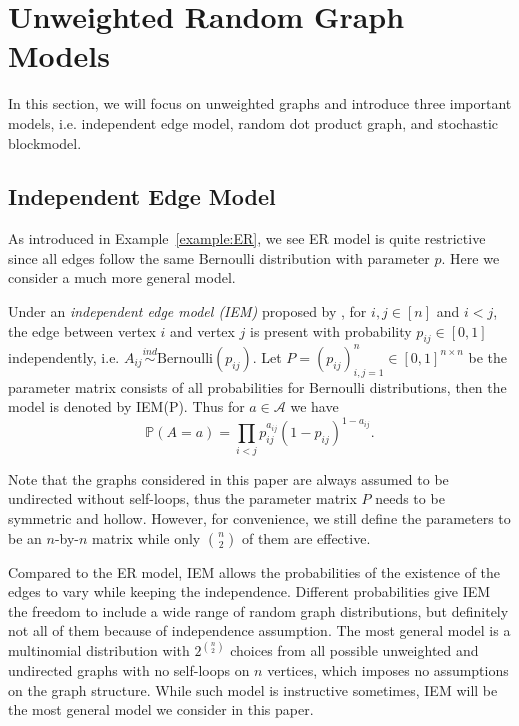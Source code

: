 \section{Unweighted Random Graph Models}
\label{sec:unweighted_graphs}

In this section, we will focus on unweighted graphs and introduce three important models, i.e. independent edge model, random dot product graph, and stochastic blockmodel. 



\subsection{Independent Edge Model}
\label{sec:IEM}

As introduced in Example~\ref{example:ER}, we see ER model is quite restrictive since all edges follow the same Bernoulli distribution with parameter $p$. Here we consider a much more general model.

\begin{definition}
\label{def:IEM}
Under an {\em{independent edge model} (IEM)} proposed by \citet{bollobas2007phase}, for $i, j \in [n]$ and $i < j$, the edge between vertex $i$ and vertex $j$ is present with probability $p_{ij} \in [0, 1]$ independently, i.e. $A_{ij} \stackrel{ind}{\sim} \mathrm{Bernoulli}(p_{ij})$. Let $P = (p_{ij})_{i,j = 1}^n \in [0, 1]^{n \times n}$ be the parameter matrix consists of all probabilities for Bernoulli distributions, then the model is denoted by IEM(P).
Thus for $a \in \mathcal{A}$ we have
\[
	\mathbb{P}(A = a) = \prod_{i < j} p_{ij}^{a_{ij}} (1 - p_{ij})^{1 - a_{ij}}.
\]
\end{definition}

Note that the graphs considered in this paper are always assumed to be undirected without self-loops, thus the parameter matrix $P$ needs to be symmetric and hollow. However, for convenience, we still define the parameters to be an $n$-by-$n$ matrix while only $n \choose 2$ of them are effective.

Compared to the ER model, IEM allows the probabilities of the existence of the edges to vary while keeping the independence. Different probabilities give IEM the freedom to include a wide range of random graph distributions, but definitely not all of them because of independence assumption. The most general model is a multinomial distribution with $2^{n \choose 2}$ choices from all possible unweighted and undirected graphs with no self-loops on $n$ vertices, which imposes no assumptions on the graph structure. While such model is instructive sometimes, IEM will be the most general model we consider in this paper. 



